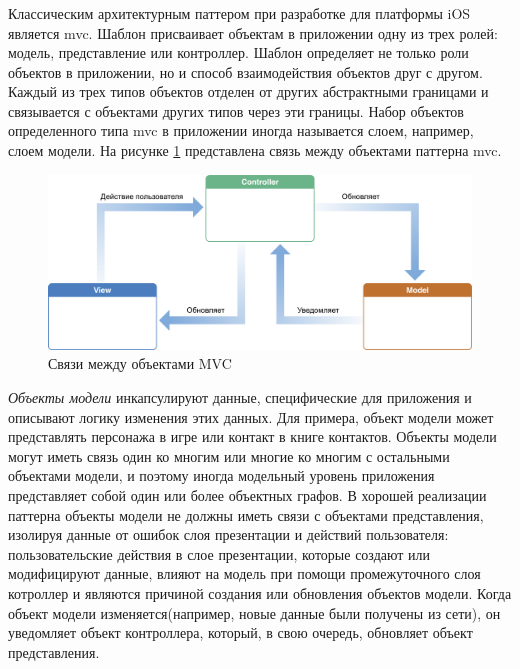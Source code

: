 \subsubsection {}
Классическим архитектурным паттером при разработке для платформы iOS является \gls{mvc}. Шаблон присваивает объектам в приложении одну из трех ролей: модель, представление или контроллер. Шаблон определяет не только роли объектов в приложении, но и способ взаимодействия объектов друг с другом. Каждый из трех типов объектов отделен от других абстрактными границами и связывается с объектами других типов через эти границы. Набор объектов определенного типа \gls{mvc} в приложении иногда называется слоем, например, слоем модели. \cite{apple:mvc} На рисунке \ref{sec:analysis:research:mobArch:apple-mvc:image:mvc} представлена связь между объектами паттерна \gls{mvc}.

\begin{figure}[h]
  \centering
    \includegraphics[width=1\textwidth]{inc/img/mvc.png}
  \caption{Связи между объектами MVC}
  \label{sec:analysis:research:mobArch:apple-mvc:image:mvc}
\end{figure}

\emph{Объекты модели} инкапсулируют данные, специфические для приложения и описывают логику изменения этих данных. Для примера, объект модели может представлять персонажа в игре или контакт в книге контактов. Объекты модели могут иметь связь один ко многим или многие ко многим с остальными объектами модели, и поэтому иногда модельный уровень приложения представляет собой один или более объектных графов. В хорошей реализации паттерна объекты модели не должны иметь связи с объектами представления, изолируя данные от ошибок слоя презентации и действий пользователя: пользовательские действия в слое презентации, которые создают или модифицируют данные, влияют на модель при помощи промежуточного слоя котроллер и являются причиной создания или обновления объектов модели. Когда объект модели изменяется(например, новые данные были получены из сети), он уведомляет объект контроллера, который, в свою очередь, обновляет объект представления.

